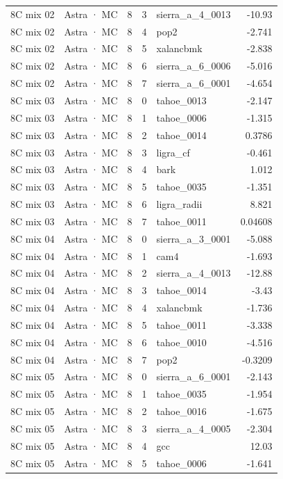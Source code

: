 \begin{tabular}{llrrlr}
8C mix 02 & Astra · MC & 8 & 3 & sierra\_a\_4\_0013 & -10.93 \\
8C mix 02 & Astra · MC & 8 & 4 & pop2 & -2.741 \\
8C mix 02 & Astra · MC & 8 & 5 & xalancbmk & -2.838 \\
8C mix 02 & Astra · MC & 8 & 6 & sierra\_a\_6\_0006 & -5.016 \\
8C mix 02 & Astra · MC & 8 & 7 & sierra\_a\_6\_0001 & -4.654 \\
8C mix 03 & Astra · MC & 8 & 0 & tahoe\_0013 & -2.147 \\
8C mix 03 & Astra · MC & 8 & 1 & tahoe\_0006 & -1.315 \\
8C mix 03 & Astra · MC & 8 & 2 & tahoe\_0014 & 0.3786 \\
8C mix 03 & Astra · MC & 8 & 3 & ligra\_cf & -0.461 \\
8C mix 03 & Astra · MC & 8 & 4 & bark & 1.012 \\
8C mix 03 & Astra · MC & 8 & 5 & tahoe\_0035 & -1.351 \\
8C mix 03 & Astra · MC & 8 & 6 & ligra\_radii & 8.821 \\
8C mix 03 & Astra · MC & 8 & 7 & tahoe\_0011 & 0.04608 \\
8C mix 04 & Astra · MC & 8 & 0 & sierra\_a\_3\_0001 & -5.088 \\
8C mix 04 & Astra · MC & 8 & 1 & cam4 & -1.693 \\
8C mix 04 & Astra · MC & 8 & 2 & sierra\_a\_4\_0013 & -12.88 \\
8C mix 04 & Astra · MC & 8 & 3 & tahoe\_0014 & -3.43 \\
8C mix 04 & Astra · MC & 8 & 4 & xalancbmk & -1.736 \\
8C mix 04 & Astra · MC & 8 & 5 & tahoe\_0011 & -3.338 \\
8C mix 04 & Astra · MC & 8 & 6 & tahoe\_0010 & -4.516 \\
8C mix 04 & Astra · MC & 8 & 7 & pop2 & -0.3209 \\
8C mix 05 & Astra · MC & 8 & 0 & sierra\_a\_6\_0001 & -2.143 \\
8C mix 05 & Astra · MC & 8 & 1 & tahoe\_0035 & -1.954 \\
8C mix 05 & Astra · MC & 8 & 2 & tahoe\_0016 & -1.675 \\
8C mix 05 & Astra · MC & 8 & 3 & sierra\_a\_4\_0005 & -2.304 \\
8C mix 05 & Astra · MC & 8 & 4 & gcc & 12.03 \\
8C mix 05 & Astra · MC & 8 & 5 & tahoe\_0006 & -1.641 \\

\end{tabular}
